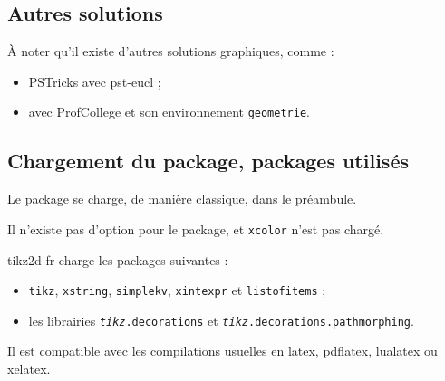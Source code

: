 \documentclass[french,a4paper,11pt]{article}
\providecommand\PSTricks{\textsf{PSTricks}\xspace}
\begin{document}
\subsection{Autres solutions}

\begin{importantblock}
À noter qu'il existe d'autres solutions graphiques, comme :

\begin{itemize}
	\item \textsf{\PSTricks} avec \textsf{pst-eucl}\footnotemark{} ;
	\item {} avec \textsf{ProfCollege} et son environnement \texttt{geometrie}\footnotemark{}.
\end{itemize}
\vspace*{-\baselineskip}\leavevmode
\end{importantblock}

\subsection{Chargement du package, packages utilisés}

\begin{importantblock}
Le package se charge, de manière classique, dans le préambule.

Il n'existe pas d'option pour le package, et \texttt{xcolor} n'est pas chargé.
\end{importantblock}


\begin{noteblock}
\textsf{tikz2d-fr} charge les packages suivantes :

\begin{itemize}
	\item \texttt{tikz}, \texttt{xstring}, \texttt{simplekv}, \texttt{xintexpr} et \texttt{listofitems} ;
	\item les librairies \texttt{\textit{tikz}.decorations} et \texttt{\textit{tikz}.decorations.pathmorphing}.
\end{itemize}

Il est compatible avec les compilations usuelles en \textsf{latex}, \textsf{pdflatex}, \textsf{lualatex} ou \textsf{xelatex}.
\end{noteblock}
\end{document}
